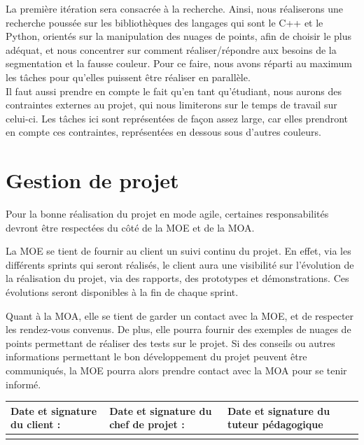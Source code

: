 \documentclass[12pt,titlepage,french]{article}
\begin{document}
La première itération sera consacrée à la recherche. Ainsi, nous réaliserons une recherche poussée sur les bibliothèques des langages qui sont le C++ et le Python, orientés sur la manipulation des nuages de points, afin de choisir le plus adéquat, et nous concentrer sur comment réaliser/répondre aux besoins de la segmentation et la fausse couleur. Pour ce faire, nous avons réparti au maximum les tâches pour qu'elles puissent être réaliser en parallèle.\\

Il faut aussi prendre en compte le fait qu'en tant qu'étudiant, nous aurons des contraintes externes au projet, qui nous limiterons sur le temps de travail sur celui-ci. Les tâches ici sont représentées de façon assez large, car elles prendront en compte ces contraintes, représentées en dessous sous d'autres couleurs.

\section{Gestion de projet}

Pour la bonne réalisation du projet en mode agile, certaines responsabilités devront être respectées du côté de la MOE et de la MOA.

La MOE se tient de fournir au client un suivi continu du projet. En effet, via les différents sprints qui seront réalisés, le client aura une visibilité sur l'évolution de la réalisation du projet, via des rapports, des prototypes et démonstrations. Ces évolutions seront disponibles à la fin de chaque sprint.

Quant à la MOA, elle se tient de garder un contact avec la MOE, et de respecter les rendez-vous convenus. De plus, elle pourra fournir des exemples de nuages de points permettant de réaliser des tests sur le projet. Si des conseils ou autres informations permettant le bon développement du projet peuvent être communiqués, la MOE pourra alors prendre contact avec la MOA pour se tenir informé.\\

\noindent\begin{tabularx}{\textwidth}{|X|X|X|}
    \hline
    \textbf{Date et signature du client :} & \textbf{Date et signature du chef de projet :} & \textbf{Date et signature du tuteur pédagogique}\\
    \hline
   \rule{0pt}{3cm} &
    &\\
    \hline

\end{tabularx}
\end{document}
